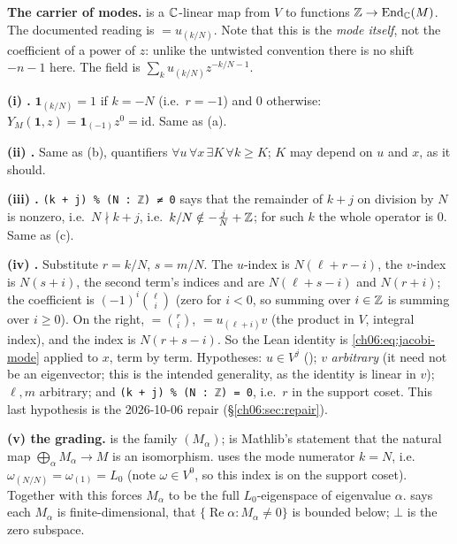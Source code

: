 \begin{dictionary}
\textbf{The carrier of modes.}   is a ${\mathbb{C}}$-linear map from
$V$ to functions ${\mathbb{Z}}\to\operatorname{End}_{\mathbb{C}}(M)$.  The documented reading is  $=u_{(k/N)}$.  Note
that this is the \emph{mode itself}, not the coefficient of a power of $z$: unlike the untwisted
 convention there is no shift $-n-1$ here.  The field is $\sum_k u_{(k/N)}z^{-k/N-1}$.

\textbf{(i) .}  $\mathbf 1_{(k/N)}=1$ if $k=-N$ (i.e.\ $r=-1$) and $0$ otherwise:
$Y_M(\mathbf 1,z)=\mathbf 1_{(-1)}z^0=\mathrm{id}$.  Same as (a).

\textbf{(ii) .}  Same as (b), quantifiers $\forall u\,\forall x\,\exists K\,
\forall k\ge K$; $K$ may depend on $u$ and $x$, as it should.

\textbf{(iii) .}  \texttt{(k + j) \% (N : ℤ) ≠ 0} says that the remainder of $k+j$ on
division by $N$ is nonzero, i.e.\ $N\nmid k+j$, i.e.\ $k/N\notin-\tfrac jN+{\mathbb{Z}}$; for such $k$ the
whole operator  is $0$.  Same as (c).

\textbf{(iv) .}  Substitute $r=k/N$, $s=m/N$.  The $u$-index
 is $N(\ell+r-i)$, the $v$-index  is $N(s+i)$, the second
term's indices  and  are $N(\ell+s-i)$ and $N(r+i)$; the
coefficient  is $(-1)^i\binom\ell i$ (zero for $i<0$, so summing over
$i\in{\mathbb{Z}}$ is summing over $i\ge0$).  On the right,  $=\binom ri$,
 $=u_{(\ell+i)}v$ (the product in $V$, integral index), and the index
 is $N(r+s-i)$.  So the Lean identity is \eqref{ch06:eq:jacobi-mode} applied to
$x$, term by term.  Hypotheses: $u\in V^j$ (); $v$
\emph{arbitrary} (it need not be an eigenvector; this is the intended generality, as the
identity is linear in $v$); $\ell,m$ arbitrary; and \texttt{(k + j) \% (N : ℤ) = 0}, i.e.\ $r$ in the
support coset.  This last hypothesis is the 2026-10-06 repair (\S\ref{ch06:sec:repair}).

\textbf{(v) the grading.}   is the family $(M_\alpha)$;
 is Mathlib's statement that the natural map
$\bigoplus_\alpha M_\alpha\to M$ is an isomorphism.   uses the mode numerator
$k=N$, i.e.\ $\omega_{(N/N)}=\omega_{(1)}=L_0$ (note $\omega\in V^0$, so this index is on the
support coset).  Together with  this forces $M_\alpha$ to be the full
$L_0$-eigenspace of eigenvalue $\alpha$.   says each $M_\alpha$ is
finite-dimensional,  that $\{\operatorname{Re}\alpha : M_\alpha\neq 0\}$ is
bounded below; $\bot$ is the zero subspace.


\end{dictionary}
